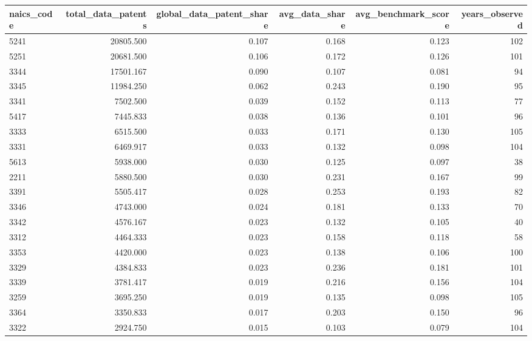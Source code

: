 \begin{tabular}{lrrrrr}
\toprule
naics_code & total_data_patents & global_data_patent_share & avg_data_share & avg_benchmark_score & years_observed \\
\midrule
5241 & 20805.500 & 0.107 & 0.168 & 0.123 & 102 \\
5251 & 20681.500 & 0.106 & 0.172 & 0.126 & 101 \\
3344 & 17501.167 & 0.090 & 0.107 & 0.081 & 94 \\
3345 & 11984.250 & 0.062 & 0.243 & 0.190 & 95 \\
3341 & 7502.500 & 0.039 & 0.152 & 0.113 & 77 \\
5417 & 7445.833 & 0.038 & 0.136 & 0.101 & 96 \\
3333 & 6515.500 & 0.033 & 0.171 & 0.130 & 105 \\
3331 & 6469.917 & 0.033 & 0.132 & 0.098 & 104 \\
5613 & 5938.000 & 0.030 & 0.125 & 0.097 & 38 \\
2211 & 5880.500 & 0.030 & 0.231 & 0.167 & 99 \\
3391 & 5505.417 & 0.028 & 0.253 & 0.193 & 82 \\
3346 & 4743.000 & 0.024 & 0.181 & 0.133 & 70 \\
3342 & 4576.167 & 0.023 & 0.132 & 0.105 & 40 \\
3312 & 4464.333 & 0.023 & 0.158 & 0.118 & 58 \\
3353 & 4420.000 & 0.023 & 0.138 & 0.106 & 100 \\
3329 & 4384.833 & 0.023 & 0.236 & 0.181 & 101 \\
3339 & 3781.417 & 0.019 & 0.216 & 0.156 & 104 \\
3259 & 3695.250 & 0.019 & 0.135 & 0.098 & 105 \\
3364 & 3350.833 & 0.017 & 0.203 & 0.150 & 96 \\
3322 & 2924.750 & 0.015 & 0.103 & 0.079 & 104 \\
\bottomrule
\end{tabular}
